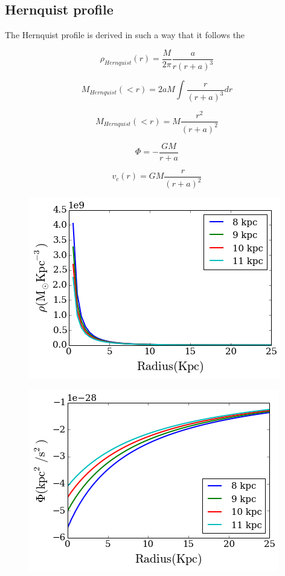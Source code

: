 \documentclass[a4paper, 12pt]{article} %
\begin{document}
\subsection{Hernquist profile}

The Hernquist profile is derived in such a way that it follows the 

\begin{equation}
\rho_{Hernquist}(r) =  \frac{M}{2\pi} \frac{a}{r(r+a)^3}
\end{equation}

\begin{equation}
M_{Hernquist}(<r) = 2aM \int \frac{r}{(r+a)^3}dr
\end{equation}

\begin{equation}
M_{Hernquist}(<r) = M \frac{r^2}{(r+a)^2}
\end{equation}

\begin{equation}
\Phi = - \frac{GM}{r+a}
\end{equation}

\begin{equation}
v_c(r) = GM \frac{r}{(r+a)^2}
\end{equation}

\begin{figure}[H]
\centering
\includegraphics[scale=0.7]{hern_density.png}
\end{figure}

\begin{figure}[H]
\centering
\includegraphics[scale=0.7]{hern_potential.png}
\end{figure}
\end{document}
